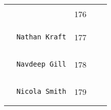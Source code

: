 \documentclass[]{article}
\begin{document}
\begin{longtable}[c]{@{}llll@{}}
\begin{minipage}[t]{0.39\columnwidth}
\begin{verbatim}
\end{verbatim}
\end{minipage} & \begin{minipage}[t]{0.10\columnwidth}\raggedright
176
\end{minipage} & \begin{minipage}[t]{0.13\columnwidth}\raggedright
\end{minipage} & \begin{minipage}[t]{0.15\columnwidth}\raggedright
\end{minipage}
\\\noalign{\medskip}
\begin{minipage}[t]{0.39\columnwidth}\raggedright
\begin{verbatim}
  Nathan Kraft
\end{verbatim}
\end{minipage} & \begin{minipage}[t]{0.10\columnwidth}\raggedright
177
\end{minipage} & \begin{minipage}[t]{0.13\columnwidth}\raggedright
\end{minipage} & \begin{minipage}[t]{0.15\columnwidth}\raggedright
\end{minipage}
\\\noalign{\medskip}
\begin{minipage}[t]{0.39\columnwidth}\raggedright
\begin{verbatim}
  Navdeep Gill
\end{verbatim}
\end{minipage} & \begin{minipage}[t]{0.10\columnwidth}\raggedright
178
\end{minipage} & \begin{minipage}[t]{0.13\columnwidth}\raggedright
\end{minipage} & \begin{minipage}[t]{0.15\columnwidth}\raggedright
\end{minipage}
\\\noalign{\medskip}
\begin{minipage}[t]{0.39\columnwidth}\raggedright
\begin{verbatim}
  Nicola Smith
\end{verbatim}
\end{minipage} & \begin{minipage}[t]{0.10\columnwidth}\raggedright
179
\end{minipage} & \begin{minipage}[t]{0.13\columnwidth}\raggedright

\end{minipage}
\end{longtable}
\end{document}
